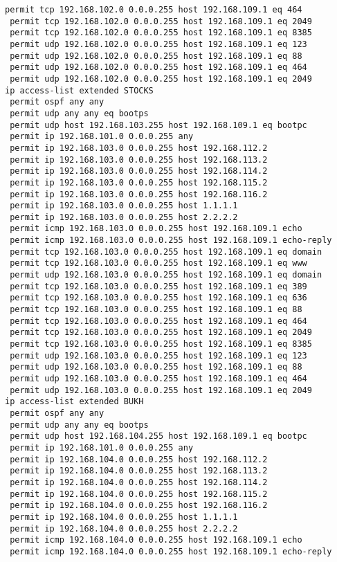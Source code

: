 \documentclass[14pt, a4paper]{extarticle}
\begin{document}
\begin{appendices}
\begin{lstlisting}[caption=Конфигурация устройства SW\_1\_L3\_IVANOV\label{list:conf_sw1_l3}]
 permit tcp 192.168.102.0 0.0.0.255 host 192.168.109.1 eq 464
 permit tcp 192.168.102.0 0.0.0.255 host 192.168.109.1 eq 2049
 permit tcp 192.168.102.0 0.0.0.255 host 192.168.109.1 eq 8385
 permit udp 192.168.102.0 0.0.0.255 host 192.168.109.1 eq 123
 permit udp 192.168.102.0 0.0.0.255 host 192.168.109.1 eq 88
 permit udp 192.168.102.0 0.0.0.255 host 192.168.109.1 eq 464
 permit udp 192.168.102.0 0.0.0.255 host 192.168.109.1 eq 2049
ip access-list extended STOCKS
 permit ospf any any
 permit udp any any eq bootps
 permit udp host 192.168.103.255 host 192.168.109.1 eq bootpc
 permit ip 192.168.101.0 0.0.0.255 any
 permit ip 192.168.103.0 0.0.0.255 host 192.168.112.2
 permit ip 192.168.103.0 0.0.0.255 host 192.168.113.2
 permit ip 192.168.103.0 0.0.0.255 host 192.168.114.2
 permit ip 192.168.103.0 0.0.0.255 host 192.168.115.2
 permit ip 192.168.103.0 0.0.0.255 host 192.168.116.2
 permit ip 192.168.103.0 0.0.0.255 host 1.1.1.1
 permit ip 192.168.103.0 0.0.0.255 host 2.2.2.2
 permit icmp 192.168.103.0 0.0.0.255 host 192.168.109.1 echo
 permit icmp 192.168.103.0 0.0.0.255 host 192.168.109.1 echo-reply
 permit tcp 192.168.103.0 0.0.0.255 host 192.168.109.1 eq domain
 permit tcp 192.168.103.0 0.0.0.255 host 192.168.109.1 eq www
 permit udp 192.168.103.0 0.0.0.255 host 192.168.109.1 eq domain
 permit tcp 192.168.103.0 0.0.0.255 host 192.168.109.1 eq 389
 permit tcp 192.168.103.0 0.0.0.255 host 192.168.109.1 eq 636
 permit tcp 192.168.103.0 0.0.0.255 host 192.168.109.1 eq 88
 permit tcp 192.168.103.0 0.0.0.255 host 192.168.109.1 eq 464
 permit tcp 192.168.103.0 0.0.0.255 host 192.168.109.1 eq 2049
 permit tcp 192.168.103.0 0.0.0.255 host 192.168.109.1 eq 8385
 permit udp 192.168.103.0 0.0.0.255 host 192.168.109.1 eq 123
 permit udp 192.168.103.0 0.0.0.255 host 192.168.109.1 eq 88
 permit udp 192.168.103.0 0.0.0.255 host 192.168.109.1 eq 464
 permit udp 192.168.103.0 0.0.0.255 host 192.168.109.1 eq 2049
ip access-list extended BUKH
 permit ospf any any
 permit udp any any eq bootps
 permit udp host 192.168.104.255 host 192.168.109.1 eq bootpc
 permit ip 192.168.101.0 0.0.0.255 any
 permit ip 192.168.104.0 0.0.0.255 host 192.168.112.2
 permit ip 192.168.104.0 0.0.0.255 host 192.168.113.2
 permit ip 192.168.104.0 0.0.0.255 host 192.168.114.2
 permit ip 192.168.104.0 0.0.0.255 host 192.168.115.2
 permit ip 192.168.104.0 0.0.0.255 host 192.168.116.2
 permit ip 192.168.104.0 0.0.0.255 host 1.1.1.1
 permit ip 192.168.104.0 0.0.0.255 host 2.2.2.2
 permit icmp 192.168.104.0 0.0.0.255 host 192.168.109.1 echo
 permit icmp 192.168.104.0 0.0.0.255 host 192.168.109.1 echo-reply

\end{lstlisting}
\end{appendices}
\end{document}
